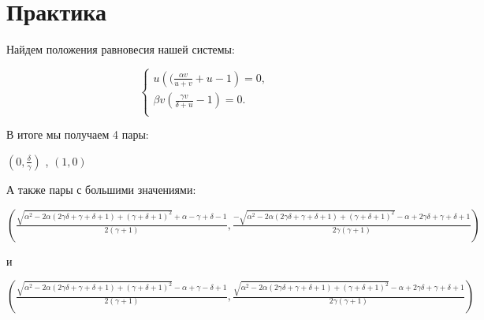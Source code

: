\chapter{Практика}
Найдем положения равновесия нашей системы:

$$ \left\{
\begin{aligned}
   u \left((\frac{\alpha  v}{u+v}+u-1\right)=0,\\
   \beta  v \left(\frac{\gamma  v}{\delta +u}-1\right)=0.\\
\end{aligned}
\right. $$

В итоге мы получаем 4 пары:

$\left ( 0, \frac{\delta }{\gamma} \right )$ ,
$\left ( 1, 0 \right )$ 

А также пары с большими значениями:

$\left ( \frac{\sqrt{\alpha ^2-2 \alpha  (2 \gamma \delta +\gamma +\delta +1)+(\gamma +\delta +1)^2}+\alpha -\gamma  +\delta  -1}{2 (\gamma  +1)}, \frac{-\sqrt{\alpha ^2-2 \alpha  (2  \gamma  \delta +\gamma +\delta +1)+(\gamma +\delta +1)^2}-\alpha +2 \gamma  \delta +\gamma +\delta +1}{2 \gamma  (\gamma +1)} \right )$ 

и

$\left ( \frac{\sqrt{\alpha ^2-2 \alpha  (2 \gamma  \delta +\gamma +\delta +1)+(\gamma +\delta +1)^2}-\alpha +\gamma -\delta +1}{2 (\gamma +1)}, \frac{\sqrt{\alpha ^2-2 \alpha  (2 \gamma  \delta +\gamma +\delta +1)+(\gamma +\delta +1)^2}-\alpha +2 \gamma \delta +\gamma +\delta +1}{2 \gamma  (\gamma +1)} \right )$ 

